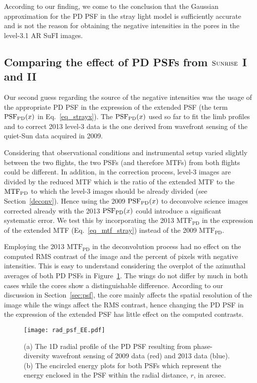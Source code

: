 \documentclass[goettingen, gauss, print]{thesis}
\begin{document}
According to our finding, we come to the conclusion that the Gaussian approximation for the PD PSF in the stray light model is sufficiently accurate and is not the reason for obtaining the negative intensities in the pores in the level-3.1 AR SuFI images.



\subsection{Comparing the effect of PD PSFs from $\textsc{Sunrise}$ I and II  }
Our second guess regarding the source of the negative intensities was the usage of the appropriate PD PSF in the expression of the extended PSF (the term $\mathrm{PSF}_{\mathrm{PD}}(x)$ in Eq.~\ref{eq_strayx}). The $\mathrm{PSF}_{\mathrm{PD}}(x)$ used so far to fit the limb profiles and to correct 2013 level-3 data is the one derived from wavefront sensing of the quiet-Sun data acquired in 2009. 

Considering that observational conditions and instrumental setup varied slightly between the two flights, the two PSFs (and therefore MTFs) from both flights could be different. In addition, in the correction process, level-3 images are divided by the reduced MTF which is the ratio of the extended MTF to the $\mathrm{MTF}_{\mathrm{PD}}$ to which the level-3 images should be already divided (see Section~\ref{deconv}). Hence using the 2009 $\mathrm{PSF}_{\mathrm{PD}}(x)$ to deconvolve science images corrected already with the 2013 $\mathrm{PSF}_{\mathrm{PD}}(x)$ could introduce a significant systematic error. We test this by incorporating the 2013 $\mathrm{MTF}_{\mathrm{PD}}$ in the expression of the extended MTF (Eq.~\ref{eq_mtf_stray}) instead of the 2009 $\mathrm{MTF}_{\mathrm{PD}}$. 

Employing the 2013 $\mathrm{MTF}_{\mathrm{PD}}$ in the deconvolution process had no effect on the computed RMS contrast of the image and the percent of pixels with negative intensities. This is easy to understand considering the overplot of the azimuthal averages of both PD PSFs in Figure~\ref{rad_psf_ee}. The wings do not differ by much in both cases while the cores show a distinguishable difference. According to our discussion in Section~\ref{sec:psf}, the core mainly affects the spatial resolution of the image while the wings affect the RMS contrast, hence changing the PD PSF in the expression of the extended PSF has little effect on the computed contrasts.

\begin{figure}
\centering
\hspace*{-2cm}\texttt{[image: rad\_psf\_EE.pdf]}
\caption{(a) The 1D radial profile of the PD PSF resulting from phase-diversity wavefront sensing of 2009 data (red) and 2013 data (blue). (b) The encircled energy plots for both PSFs which represent the energy enclosed in the PSF within the radial distance, $r$, in arcsec.}
\label{rad_psf_ee}
\end{figure}
\end{document}
